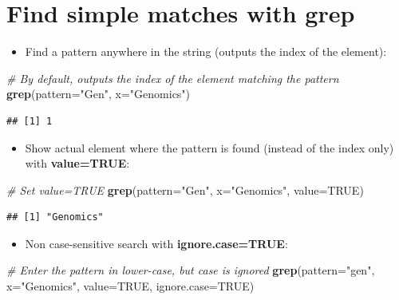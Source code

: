 \documentclass[]{book}
\newenvironment{Shaded}{\begin{snugshade}}{\end{snugshade}}
\newcommand{\CommentTok}[1]{\textcolor[rgb]{0.56,0.35,0.01}{\textit{#1}}}
\newcommand{\DataTypeTok}[1]{\textcolor[rgb]{0.13,0.29,0.53}{#1}}
\newcommand{\KeywordTok}[1]{\textcolor[rgb]{0.13,0.29,0.53}{\textbf{#1}}}
\newcommand{\NormalTok}[1]{#1}
\newcommand{\OtherTok}[1]{\textcolor[rgb]{0.56,0.35,0.01}{#1}}
\newcommand{\StringTok}[1]{\textcolor[rgb]{0.31,0.60,0.02}{#1}}
\providecommand{\tightlist}{%
  \setlength{\itemsep}{0pt}\setlength{\parskip}{0pt}}
\begin{document}
\hypertarget{find-simple-matches-with-grep}{%
\section{Find simple matches with grep}\label{find-simple-matches-with-grep}}

\begin{itemize}
\tightlist
\item
  Find a pattern anywhere in the string (outputs the index of the element):
\end{itemize}

\begin{Shaded}
\begin{Highlighting}[]
\CommentTok{# By default, outputs the index of the element matching the pattern}
\KeywordTok{grep}\NormalTok{(}\DataTypeTok{pattern=}\StringTok{"Gen"}\NormalTok{, }
    \DataTypeTok{x=}\StringTok{"Genomics"}\NormalTok{)}
\end{Highlighting}
\end{Shaded}

\begin{verbatim}
## [1] 1
\end{verbatim}

\begin{itemize}
\tightlist
\item
  Show actual element where the pattern is found (instead of the index only) with \textbf{value=TRUE}:
\end{itemize}

\begin{Shaded}
\begin{Highlighting}[]
\CommentTok{# Set value=TRUE}
\KeywordTok{grep}\NormalTok{(}\DataTypeTok{pattern=}\StringTok{"Gen"}\NormalTok{,}
        \DataTypeTok{x=}\StringTok{"Genomics"}\NormalTok{,}
        \DataTypeTok{value=}\OtherTok{TRUE}\NormalTok{)}
\end{Highlighting}
\end{Shaded}

\begin{verbatim}
## [1] "Genomics"
\end{verbatim}

\begin{itemize}
\tightlist
\item
  Non case-sensitive search with \textbf{ignore.case=TRUE}:
\end{itemize}

\begin{Shaded}
\begin{Highlighting}[]
\CommentTok{# Enter the pattern in lower-case, but case is ignored}
\KeywordTok{grep}\NormalTok{(}\DataTypeTok{pattern=}\StringTok{"gen"}\NormalTok{,}
        \DataTypeTok{x=}\StringTok{"Genomics"}\NormalTok{,}
        \DataTypeTok{value=}\OtherTok{TRUE}\NormalTok{,}
        \DataTypeTok{ignore.case=}\OtherTok{TRUE}\NormalTok{)}
\end{Highlighting}
\end{Shaded}
\end{document}

